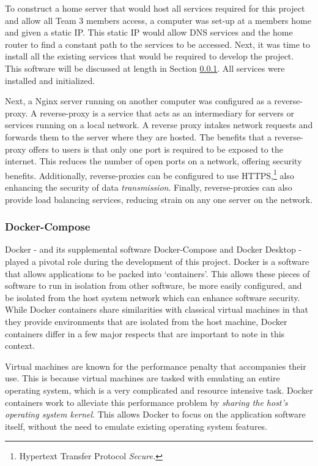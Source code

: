 \documentclass{article}
\begin{document}
To construct a home server that would host all services required for this project and allow all Team 3 members access, a computer 
was set-up at a members home and given a static IP. This static IP would allow DNS services and the home router to find a constant path 
to the services to be accessed. Next, it was time to install all the existing services that would be required to develop the project. This 
software will be discussed at length in Section \ref{sec:docker}. All services were installed and initialized. 

Next, a Nginx server 
running on another computer was configured as a reverse-proxy. A reverse-proxy is a service that acts as an intermediary for servers or 
services running on a local network. A reverse proxy intakes network requests and forwards them to the server where they are hosted. 
The benefits that a reverse-proxy offers to users is that only one 
port is required to be exposed to the internet. This reduces the number of open ports on a network, offering security benefits. Additionally,
reverse-proxies can be configured to use HTTPS,\footnote{Hypertext Transfer Protocol \textit{Secure.}} also enhancing the security of data 
\textit{transmission}. Finally, reverse-proxies can also provide load balancing services, reducing strain on any one server on the 
network. 

\subsubsection{Docker-Compose}
\label{sec:docker}
Docker - and its supplemental software Docker-Compose and Docker Desktop - played a pivotal role during the development of this project.
Docker is a software that allows applications to be packed into `containers'. This allows these pieces of software to run in isolation from 
other software, be more easily configured, and be isolated from the host system network which can enhance software security. While Docker 
containers share similarities with classical virtual machines in that they provide environments that are isolated from the host machine, 
Docker containers differ in a few major respects that are important to note in this context. 

Virtual machines are known for the performance penalty that accompanies their use. This is because virtual machines are tasked with 
emulating an entire operating system, which is a very complicated and resource intensive task. Docker containers work to alleviate 
this performance problem by \textit{sharing the host's operating system kernel}. This allows Docker to focus on the application 
software itself, without the need to emulate existing operating system features. 
\end{document}
